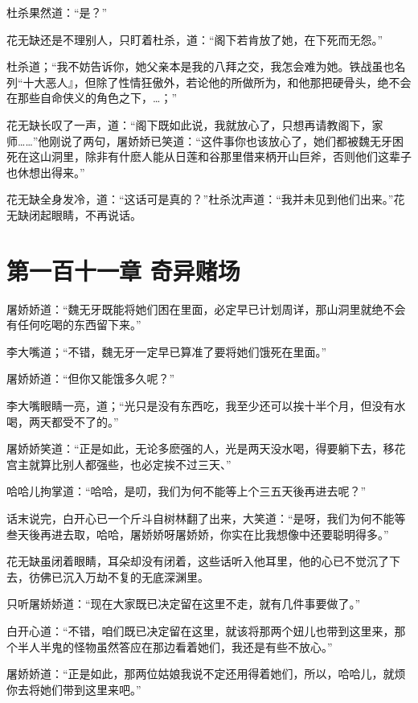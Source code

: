 \documentclass[12pt,oneside]{book}
\begin{document}
杜杀果然道：``是？''

花无缺还是不理别人，只盯着杜杀，道：``阁下若肯放了她，在下死而无怨。''

杜杀道；``我不妨告诉你，她父亲本是我的八拜之交，我怎会难为她。铁战虽也名列``十大恶人』，但除了性情狂傲外，若论他的所做所为，和他那把硬骨头，绝不会在那些自命侠义的角色之下，\ldots；''

花无缺长叹了一声，道：``阁下既如此说，我就放心了，只想再请教阁下，家师\ldots\ldots{}''他刚说了两句，屠娇娇已笑道：``这件事你也该放心了，她们都被魏无牙困死在这山洞里，除非有什麽人能从日莲和谷那里借来柄开山巨斧，否则他们这辈子也休想出得来。''

花无缺全身发冷，道：``这话可是真的？''杜杀沈声道：``我并未见到他们出来。''花无缺闭起眼睛，不再说话。

\hypertarget{ux7b2cux4e00ux767eux5341ux4e00ux7ae0-ux5947ux5f02ux8d4cux573a}{%
\chapter{第一百十一章
奇异赌场}\label{ux7b2cux4e00ux767eux5341ux4e00ux7ae0-ux5947ux5f02ux8d4cux573a}}

屠娇娇道：``魏无牙既能将她们困在里面，必定早已计划周详，那山洞里就绝不会有任何吃喝的东西留下来。''

李大嘴道；``不错，魏无牙一定早已算准了要将她们饿死在里面。''

屠娇娇道：``但你又能饿多久呢？''

李大嘴眼睛一亮，道；``光只是没有东西吃，我至少还可以挨十半个月，但没有水喝，两天都受不了的。''

屠娇娇笑道：``正是如此，无论多麽强的人，光是两天没水喝，得要躺下去，移花宫主就算比别人都强些，也必定挨不过三天、''

哈哈儿拘掌道：``哈哈，是叨，我们为何不能等上个三五天後再进去呢？''

话末说完，白开心已一个斤斗自树林翻了出来，大笑道：``是呀，我们为何不能等叁天後再进去取，哈哈，屠娇娇呀屠娇娇，你实在比我想像中还要聪明得多。''

花无缺虽闭着眼睛，耳朵却没有闭着，这些话听入他耳里，他的心已不觉沉了下去，彷佛已沉入万劫不复的无底深渊里。

只听屠娇娇道：``现在大家既已决定留在这里不走，就有几件事要做了。''

白开心道：``不错，咱们既已决定留在这里，就该将那两个妞儿也带到这里来，那个半人半鬼的怪物虽然答应在那边看着她们，我还是有些不放心。''

屠娇娇道：``正是如此，那两位姑娘我说不定还用得着她们，所以，哈哈儿，就烦你去将她们带到这里来吧。''
\end{document}
